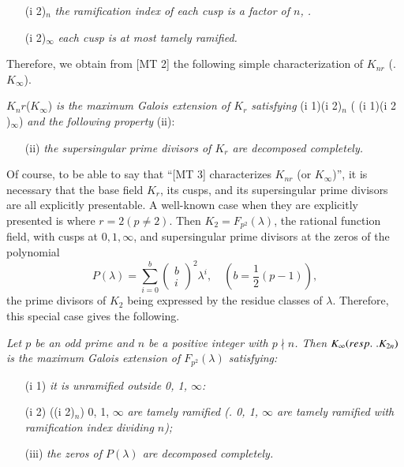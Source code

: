 \begin{remark}
\begin{itemize}
\item[(i 2)$_n$] \textit{the ramification index of each cusp is a factor of $n$, \resp.}

\item[(i 2)$_\infty$] \textit{each cusp is at most tamely ramified.}
\end{itemize}
Therefore, we obtain from [MT 2] the following simple characterization of $K_{nr}$ (\resp. $K_\infty$).
\end{remark}

\medskip
[MT 3] $K_nr$\pageoriginale (\resp $K_\infty$) \textit{is the maximum Galois extension of $K_r$ satisfying} (i 1)(i 2)$_n$ (\textit{\resp} (i 1)(i 2 )$_\infty$) \textit{and the following property} (ii):

\begin{itemize}
\item[(ii)] \textit{the supersingular prime divisors of $K_r$ are decomposed completely.}
\end{itemize}

Of course, to be able to say that ``[MT 3] characterizes $K_{nr}$ (or $K_\infty$)'', it is necessary that the base field $K_r$, its cusps, and its supersingular prime divisors are all explicitly presentable. A well-known case when they are explicitly presented is where $r = 2 (p \neq 2)$. Then $K_2 = F_{p^2} (\lambda)$, the rational function field, with cusps at $0, 1, \infty$, and supersingular prime divisors at the zeros of the polynomial
$$
P(\lambda) = \sum\limits^b_{i=0} \begin{pmatrix}
b \\
i
\end{pmatrix}^2  \lambda^i, \quad (b = \frac{1}{2} (p-1)),
$$
the prime divisors of $K_2$ being expressed by the residue classes of $\lambda$. Therefore, this special case gives the following.
 
\textit{Let $p$ be an odd prime and $n$ be a positive integer with $p \nmid n$. Then $K_\infty ({resp.}\kern.3em. K_{2n})$ is the maximum Galois extension of $F_{p^2}(\lambda)$ satisfying:}
\begin{itemize}
\item[(i 1)] \textit{it is unramified outside 0, 1, $\infty$:}

\item[(i 2)] (\resp (i 2)$_n$) 0, 1, $\infty$ \textit{are tamely ramified (\resp. 0, 1, $\infty$ are tamely ramified with ramification index dividing $n$);}

\item[(iii)] \textit{the zeros of $P(\lambda)$ are decomposed completely.}
\end{itemize}

